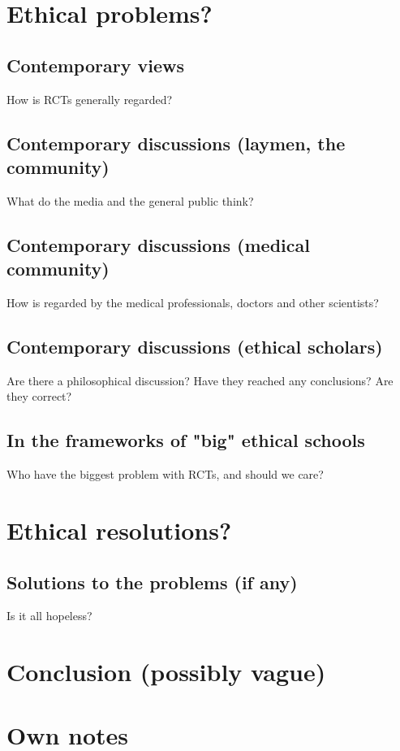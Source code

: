 \documentclass[12p]{article}
\begin{document}
\section*{Ethical problems?}
\subsection*{Contemporary views}
How is RCTs generally regarded?
\subsection*{Contemporary discussions (laymen, the community)}
What do the media and the general public think?
\subsection*{Contemporary discussions (medical community)}
How is regarded by the medical professionals, doctors and other scientists?
\subsection*{Contemporary discussions (ethical scholars)}
Are there a philosophical discussion? Have they reached any conclusions? Are they correct?
\subsection*{In the frameworks of "big" ethical schools}
Who have the biggest problem with RCTs, and should we care?


\section*{Ethical resolutions?}
\subsection*{Solutions to the problems (if any)}
Is it all hopeless?
\section*{Conclusion (possibly vague)}

\section*{Own notes}
\end{document}
